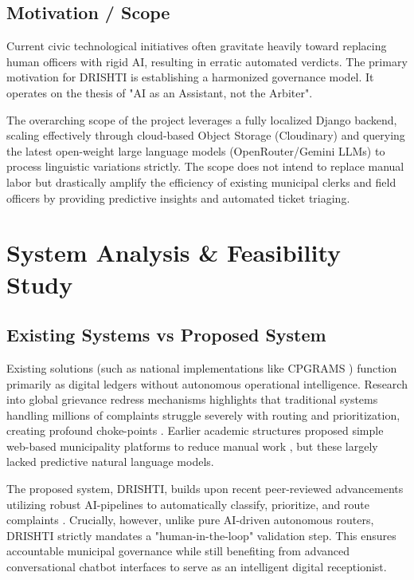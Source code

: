 \documentclass[12pt,a4paper]{report}
\begin{document}
\section{Motivation / Scope}
Current civic technological initiatives often gravitate heavily toward replacing human officers with rigid AI, resulting in erratic automated verdicts. The primary motivation for DRISHTI is establishing a harmonized governance model. It operates on the thesis of "AI as an Assistant, not the Arbiter". 

The overarching scope of the project leverages a fully localized Django backend, scaling effectively through cloud-based Object Storage (Cloudinary) and querying the latest open-weight large language models (OpenRouter/Gemini LLMs) to process linguistic variations strictly. The scope does not intend to replace manual labor but drastically amplify the efficiency of existing municipal clerks and field officers by providing predictive insights and automated ticket triaging.

\chapter{System Analysis \& Feasibility Study}

\section{Existing Systems vs Proposed System}
Existing solutions (such as national implementations like CPGRAMS \cite{ref_imoc}) function primarily as digital ledgers without autonomous operational intelligence. Research into global grievance redress mechanisms highlights that traditional systems handling millions of complaints struggle severely with routing and prioritization, creating profound choke-points \cite{ref_worldbank}. Earlier academic structures proposed simple web-based municipality platforms to reduce manual work \cite{ref_aijmr}, but these largely lacked predictive natural language models.

The proposed system, DRISHTI, builds upon recent peer-reviewed advancements utilizing robust AI-pipelines to automatically classify, prioritize, and route complaints \cite{ref_icaaai}. Crucially, however, unlike pure AI-driven autonomous routers, DRISHTI strictly mandates a "human-in-the-loop" validation step. This ensures accountable municipal governance while still benefiting from advanced conversational chatbot interfaces \cite{ref_aip} to serve as an intelligent digital receptionist.
\end{document}
